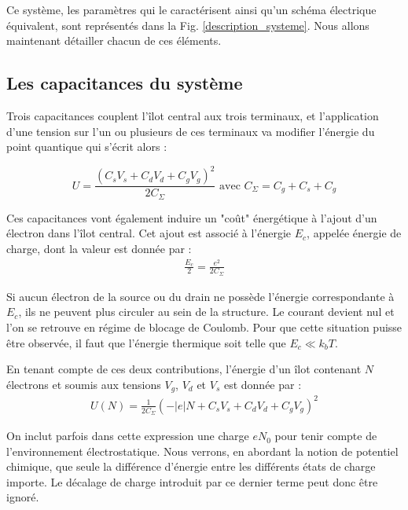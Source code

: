 Ce système, les paramètres qui le caractérisent ainsi qu'un schéma électrique équivalent, sont représentés dans la Fig. \ref{description_systeme}. Nous allons maintenant détailler chacun de ces éléments.


\subsection{Les capacitances du système}
Trois capacitances couplent l'\^ilot central aux trois terminaux, et l'application d'une tension sur l'un ou plusieurs de ces terminaux va modifier l'énergie du point quantique qui s'écrit alors :

\begin{equation}
U = \frac{(C_sV_s + C_dV_d + C_gV_g)^2}{2C_{\Sigma}}
\text{   avec    } 
 C_{\Sigma} = C_g + C_s + C_g \nonumber
\end{equation}

Ces capacitances vont également induire un "co\^ut" énergétique à l'ajout d'un électron dans l'\^ilot central. Cet ajout est associé à l'énergie $E_c$, appelée énergie de charge, dont la valeur est donnée par :
\begin{eqnarray}
\frac{E_c}{2} = \frac{e^2}{2C_{\Sigma}} \nonumber
\end{eqnarray}

Si aucun électron de la source ou du drain ne possède l'énergie correspondante à $E_c$, ils ne peuvent plus circuler au sein de la structure. Le courant devient nul et l'on se retrouve en régime de blocage de Coulomb. Pour que cette situation puisse être observée, il faut que l'énergie thermique soit telle que $E_c \ll k_bT$.

En tenant compte de ces deux contributions, l'énergie d'un \^ilot contenant $N$ électrons et soumis aux tensions $V_g$, $V_d$ et $V_s$ est donnée par :
\begin{eqnarray}
U(N) = \frac{1}{2C_{\Sigma}} (-|e|N + C_sV_s + C_dV_d + C_gV_g)^2
\end{eqnarray}

On inclut parfois dans cette expression une charge $eN_0$ pour tenir compte de l'environnement électrostatique. Nous verrons, en abordant la notion de potentiel chimique, que seule la différence d'énergie entre les différents états de charge importe. Le décalage de charge introduit par ce dernier terme peut donc \^etre ignoré. \newline


